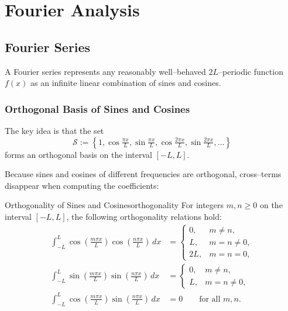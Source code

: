 \chapter{Fourier Analysis}
\label{ch:fourier}

\section{Fourier Series}
\label{sec:fourier-series}

A Fourier series represents any reasonably well--behaved \(2L\)--periodic function \(f(x)\) as an infinite linear combination of sines and cosines.

\subsection{Orthogonal Basis of Sines and Cosines}
The key idea is that the set
\begin{equation}
    \mathcal{S} := \left\{1,\cos\tfrac{\pi x}{L},\sin\tfrac{\pi x}{L},\cos\tfrac{2\pi x}{L},\sin\tfrac{2\pi x}{L},\dots \right\}
\end{equation}
forms an orthogonal basis on the interval \([-L,L]\).

Because sines and cosines of different frequencies are orthogonal, cross--terms disappear when computing the coefficients:

\begin{proposition}{Orthogonality of Sines and Cosines}{orthogonality}
    For integers \( m, n \geq 0 \) on the interval \([-L, L]\), the following orthogonality relations hold:
    \begin{align*}
        \int_{-L}^{L} \cos\left(\tfrac{m\pi x}{L}\right) \cos\left(\tfrac{n\pi x}{L}\right) \, dx
         & =
        \begin{cases}
            0,  & m \neq n,     \\
            L,  & m = n \neq 0, \\
            2L, & m = n = 0,
        \end{cases}             \\
        \int_{-L}^{L} \sin\left(\tfrac{m\pi x}{L}\right) \sin\left(\tfrac{n\pi x}{L}\right) \, dx
         & =
        \begin{cases}
            0, & m \neq n,     \\
            L, & m = n \neq 0,
        \end{cases}              \\
        \int_{-L}^{L} \cos\left(\tfrac{m\pi x}{L}\right) \sin\left(\tfrac{n\pi x}{L}\right) \, dx
         & = 0 \qquad \text{for all } m, n.
    \end{align*}
\end{proposition}

